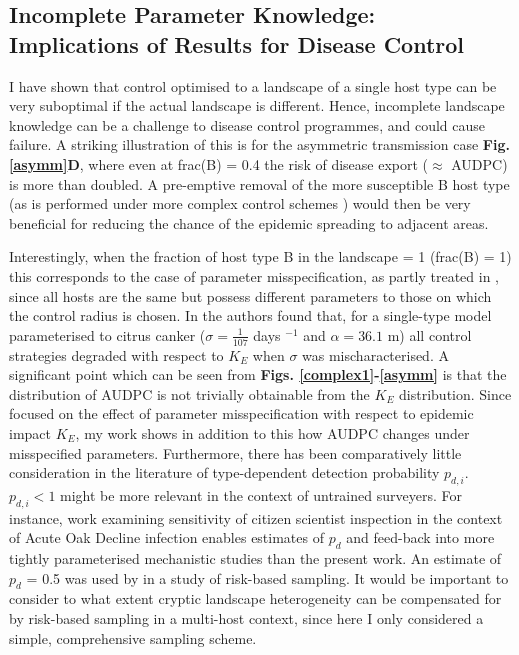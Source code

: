 \documentclass[11pt,letterpaper]{article}
\begin{document}
\subsection*{Incomplete Parameter Knowledge: Implications of Results for Disease Control}

I have shown that control optimised to a landscape of a single host type can be very suboptimal if the actual landscape is different. Hence, incomplete landscape knowledge can be a challenge to disease control programmes, and could cause failure. A striking illustration of this is for the asymmetric transmission case \textbf{Fig. \ref{asymm}D}, where even at frac(B) = 0.4 the risk of disease export ($\approx$ AUDPC) is more than doubled. A pre-emptive removal of the more susceptible B host type (as is performed under more complex control schemes \cite{HyattTwynam2017}) would then be very beneficial for reducing the chance of the epidemic spreading to adjacent areas.

Interestingly, when the fraction of host type B in the landscape = 1 (frac(B) = 1) this corresponds to the case of parameter misspecification, as partly treated in \cite{HyattTwynam2017}, since all hosts are the same but possess different parameters to those on which the control radius is chosen. In \cite{HyattTwynam2017} the authors found that, for a single-type model parameterised to citrus canker ($\sigma = \frac{1}{107}$ days $^{-1}$ and $\alpha = 36.1$ m) all control strategies degraded with respect to $K_E$ when $\sigma$ was mischaracterised. A significant point which can be seen from \textbf{Figs. \ref{complex1}-\ref{asymm}} is that the distribution of AUDPC is not trivially obtainable from the $K_E$ distribution. Since \cite{HyattTwynam2017} focused on the effect of parameter misspecification with respect to epidemic impact $K_E$, my work shows in addition to this how AUDPC changes under misspecified parameters. Furthermore, there has been comparatively little consideration in the literature of type-dependent detection probability $p_{d,i}$. $p_{d,i} < 1$ might be more relevant in the context of untrained surveyers. For instance, work examining sensitivity of citizen scientist inspection in the context of Acute Oak Decline infection enables estimates of $p_d$ \cite{Combes2025} and feed-back into more tightly parameterised mechanistic studies than the present work. An estimate of $p_d$ = 0.5 was used by \cite{Mastin2020} in a study of risk-based sampling. It would be important to consider to what extent cryptic landscape heterogeneity can be compensated for by risk-based sampling in a multi-host context, since here I only considered a simple, comprehensive sampling scheme. 
\end{document}

